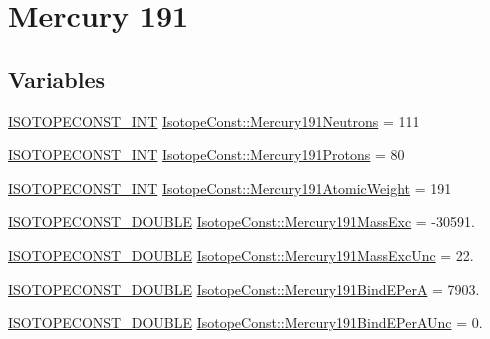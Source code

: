\hypertarget{group___isotope_const-_mercury-_hg191}{}\section{Mercury 191}
\label{group___isotope_const-_mercury-_hg191}
\subsection*{Variables}
\begin{DoxyCompactItemize}
\item 
\mbox{\hyperlink{group___isotope_const-_macros_ga5f18360b3e99483a35c32d789e62621c}{I\+S\+O\+T\+O\+P\+E\+C\+O\+N\+S\+T\+\_\+\+I\+NT}} \mbox{\hyperlink{group___isotope_const-_mercury-_hg191_ga82454e8815cd41784435cf0e2e05c0f9}{Isotope\+Const\+::\+Mercury191\+Neutrons}} = 111
\item 
\mbox{\hyperlink{group___isotope_const-_macros_ga5f18360b3e99483a35c32d789e62621c}{I\+S\+O\+T\+O\+P\+E\+C\+O\+N\+S\+T\+\_\+\+I\+NT}} \mbox{\hyperlink{group___isotope_const-_mercury-_hg191_gaf8cbeccc3fc03c10e6970ee7690baca4}{Isotope\+Const\+::\+Mercury191\+Protons}} = 80
\item 
\mbox{\hyperlink{group___isotope_const-_macros_ga5f18360b3e99483a35c32d789e62621c}{I\+S\+O\+T\+O\+P\+E\+C\+O\+N\+S\+T\+\_\+\+I\+NT}} \mbox{\hyperlink{group___isotope_const-_mercury-_hg191_ga1c01a60e9bb8a300273bdc390f18adee}{Isotope\+Const\+::\+Mercury191\+Atomic\+Weight}} = 191
\item 
\mbox{\hyperlink{group___isotope_const-_macros_ga8f45a7272ce02c0b4c65c44636ed719a}{I\+S\+O\+T\+O\+P\+E\+C\+O\+N\+S\+T\+\_\+\+D\+O\+U\+B\+LE}} \mbox{\hyperlink{group___isotope_const-_mercury-_hg191_ga914822e904a1399f65fef501afe440ea}{Isotope\+Const\+::\+Mercury191\+Mass\+Exc}} = -\/30591.
\item 
\mbox{\hyperlink{group___isotope_const-_macros_ga8f45a7272ce02c0b4c65c44636ed719a}{I\+S\+O\+T\+O\+P\+E\+C\+O\+N\+S\+T\+\_\+\+D\+O\+U\+B\+LE}} \mbox{\hyperlink{group___isotope_const-_mercury-_hg191_ga65d48e38105d0b9be3ff397db5488a58}{Isotope\+Const\+::\+Mercury191\+Mass\+Exc\+Unc}} = 22.
\item 
\mbox{\hyperlink{group___isotope_const-_macros_ga8f45a7272ce02c0b4c65c44636ed719a}{I\+S\+O\+T\+O\+P\+E\+C\+O\+N\+S\+T\+\_\+\+D\+O\+U\+B\+LE}} \mbox{\hyperlink{group___isotope_const-_mercury-_hg191_gae16cc801f8aac1e0196dbceb36d3f82d}{Isotope\+Const\+::\+Mercury191\+Bind\+E\+PerA}} = 7903.
\item 
\mbox{\hyperlink{group___isotope_const-_macros_ga8f45a7272ce02c0b4c65c44636ed719a}{I\+S\+O\+T\+O\+P\+E\+C\+O\+N\+S\+T\+\_\+\+D\+O\+U\+B\+LE}} \mbox{\hyperlink{group___isotope_const-_mercury-_hg191_ga6183e0e46d57bf45980c8dca3f7c1833}{Isotope\+Const\+::\+Mercury191\+Bind\+E\+Per\+A\+Unc}} = 0.

\end{DoxyCompactItemize}
